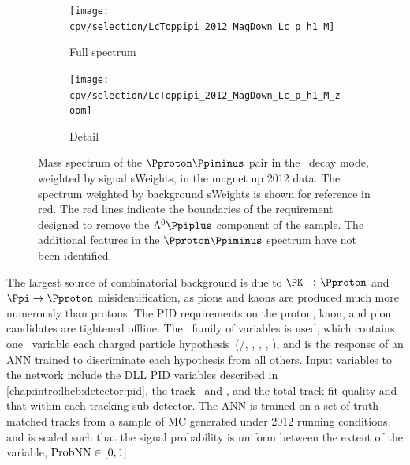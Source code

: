 \begin{figure}
  \begin{subfigure}[b]{0.5\textwidth}
    \texttt{[image: cpv/selection/LcToppipi\_2012\_MagDown\_Lc\_p\_h1\_M]}
    \caption{Full spectrum}
    \label{fig:cpv:selection:ppipi_lambda_cut:full}
  \end{subfigure}
  \begin{subfigure}[b]{0.5\textwidth}
    \texttt{[image: cpv/selection/LcToppipi\_2012\_MagDown\_Lc\_p\_h1\_M\_zoom]}
    \caption{Detail}
    \label{fig:cpv:selection:ppipi_lambda_cut:zoom}
  \end{subfigure}
  \caption{%
    Mass spectrum of the $\Pproton\Ppiminus$ pair in the \ppipi\ decay mode, 
    weighted by signal sWeights, in the magnet up 2012 data.
    The spectrum weighted by background sWeights is shown for reference in red.
    The red lines indicate the boundaries of the requirement designed to remove 
    the $\PLambda\Ppiplus$ component of the sample.
    The additional features in the $\Pproton\Ppiminus$ spectrum have not been 
    identified.
  }
  \label{fig:cpv:selection:ppipi_lambda_cut}
\end{figure}

The largest source of combinatorial background is due to $\PK \to \Pproton$ and 
$\Ppi \to \Pproton$ misidentification, as pions and kaons are produced much 
more numerously than protons.
The \ac{PID} requirements on the proton, kaon, and pion candidates are 
tightened offline.
The \probnn\ family of variables is used, which contains one \probnn\ variable 
each charged particle hypothesis~(\Pproton/\APproton, \PKpm, \Ppipm, \Pmupm, 
\Pepm), and is the response of an \ac{ANN} trained to discriminate each 
hypothesis from all others.
Input variables to the network include the \ac{DLL} \ac{PID} variables 
described in \cref{chap:intro:lhcb:detector:pid}, the track \ptot\ and \pT, and 
the total track fit quality and that within each tracking sub-detector.
The \ac{ANN} is trained on a set of truth-matched tracks from a sample of 
\ac{MC} generated under 2012 running conditions, and is scaled such that the 
signal probability is uniform between the extent of the variable, 
$\text{ProbNN} \in [0, 1]$.

